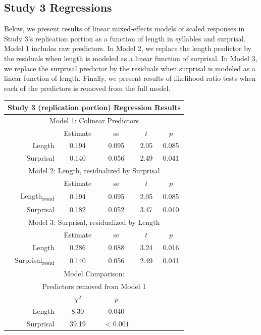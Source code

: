 \begin{appendices}
\section{Study 3 Regressions}


Below, we present results of linear mixed-effects models of scaled responses in Study 3's replication portion as a function of length in syllables and surprisal.
Model 1 includes raw predictors.
In Model 2, we replace the length predictor by the residuals when length is modeled as a linear function of surprisal.
In Model 3, we replace the surprisal predictor by the residuals when surprisal is modeled as a linear function of length.
Finally, we present results of likelihood ratio tests when each of the predictors is removed from the full model.

\vspace{4mm}

\noindent
\footnotesize{
\begin{tabular}{r|cccc}
\hline
\hline
\multicolumn{5}{c}{\textbf{Study 3 (replication portion) Regression Results}} \\
\hline
\hline
\multicolumn{5}{c}{Model 1: Colinear Predictors} \\
& Estimate & se & $t$ & $p$ \\
\hline
Length & 0.194 & 0.095 & 2.05 & 0.085 \\
Surprisal & 0.140 & 0.056 & 2.49 & 0.041 \\
\hline
\hline
\multicolumn{5}{c}{Model 2: Length, residualized by Surprisal} \\
& Estimate & se & $t$ & $p$ \\
\hline
Length\textsubscript{resid} & 0.194 & 0.095 & 2.05 & 0.085 \\
Surprisal & 0.182 & 0.052 & 3.47 & 0.010 \\
\hline
\hline
\multicolumn{5}{c}{Model 3: Surprisal, residualized by Length} \\
& Estimate & se & $t$ & $p$ \\
\hline
Length & 0.286 & 0.088 & 3.24 & 0.016 \\
Surprisal\textsubscript{resid} & 0.140 & 0.056 & 2.49 & 0.041 \\
\hline
\hline
\multicolumn{5}{c}{Model Comparison:} \\
\multicolumn{5}{c}{Predictors removed from Model 1} \\
& $\chi^2$ & $p$ \\
\hline
Length & 8.30 & 0.040 \\
Surprisal & 39.19 & $<0.001$ \\
\hline
\hline
\end{tabular}
}


\end{appendices}
